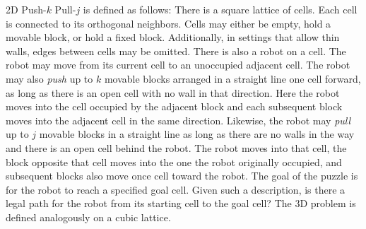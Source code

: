 2D Push-$k$ Pull-$j$ is defined as follows: There is a square lattice of cells. Each cell is connected to its orthogonal neighbors. Cells may either be empty, hold a movable block, or hold a fixed block. Additionally, in settings that allow thin walls, edges between cells may be omitted. There is also a robot on a cell. The robot may move from its current cell to an unoccupied adjacent cell. The robot may also \emph{push} up to $k$ movable blocks arranged in a straight line one cell forward, as long as there is an open cell with no wall in that direction. Here the robot moves into the cell occupied by the adjacent block and each subsequent block moves into the adjacent cell in the same direction. Likewise, the robot may \emph{pull} up to $j$ movable blocks in a straight line as long as there are no walls in the way and there is an open cell behind the robot. The robot moves into that cell, the block opposite that cell moves into the one the robot originally occupied, and subsequent blocks also move once cell toward the robot. The goal of the puzzle is for the robot to reach a specified goal cell. Given such a description, is there a legal path for the robot from its starting cell to the goal cell? The 3D problem is defined analogously on a cubic lattice.

